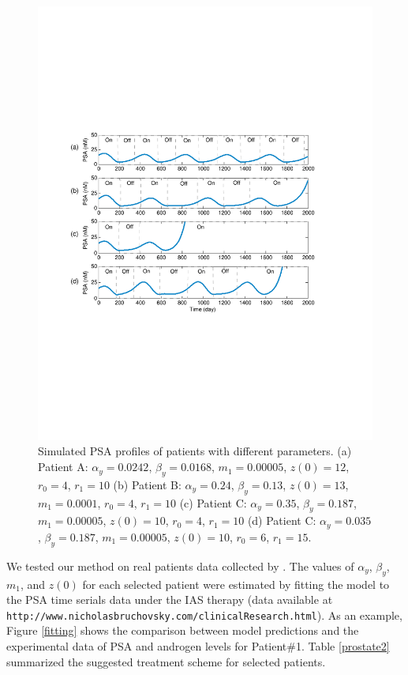\begin{figure}[htb]
\centering
\includegraphics[scale=0.5]{fig-prostatetraj2}
\caption{Simulated PSA profiles of patients with different parameters. (a) Patient A: $\alpha_y=0.0242$, $\beta_y=0.0168$, $m_1=0.00005$, $z(0)=12$, $r_0=4$, $r_1=10$ (b) Patient B: $\alpha_y=0.24$, $\beta_y=0.13$, $z(0)=13$, $m_1=0.0001$, $r_0=4$, $r_1=10$ (c) Patient C: $\alpha_y=0.35$, $\beta_y=0.187$, $m_1=0.00005$, $z(0)=10$, $r_0=4$, $r_1=10$ (d) Patient C: $\alpha_y=0.035$, $\beta_y=0.187$, $m_1=0.00005$, $z(0)=10$, $r_0=6$, $r_1=15$.}
\label{patients}
\end{figure}

We tested our method on real patients data collected by \cite{bruchovsky07}. The values of $\alpha_y$, $\beta_y$, $m_1$, and $z(0)$ for each selected patient were estimated by fitting the model to the PSA time serials data under the IAS therapy (data available at \verb#http://www.nicholasbruchovsky.com/clinicalResearch.html#). As an example, Figure \ref{fitting} shows the comparison between model predictions and the experimental data of PSA and androgen levels for Patient\#1. Table \ref{prostate2} summarized the suggested treatment scheme for selected patients. %

